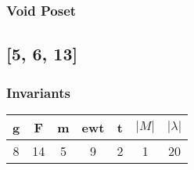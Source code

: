 \documentclass[a4paper]{article}
\begin{document}
\hfill\begin{minipage}{0.48\textwidth}
\subsubsection*{Void Poset}
\centering
{}
\end{minipage}
\newpage\subsection{[5, 6, 13]}
\noindent\begin{minipage}{0.6\textwidth}
\subsubsection*{Invariants}
\centering
\begin{tabular}{|c|c|c|c|c|c|c|}
\toprule
g & F & m & ewt & t & \(|M|\) & \(|\lambda|\) \\
\midrule
8 & 14 & 5 & 9 & 2 & 1 & 20 \\
\bottomrule
\end{tabular}
\end{minipage}%
\end{document}

